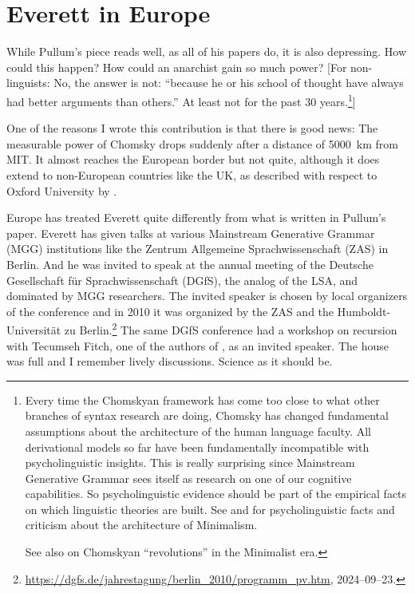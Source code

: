 \documentclass[output=paper,colorlinks,citecolor=brown]{langscibook}
\begin{document}
\section{Everett in Europe}

While Pullum's piece reads well, as all of his papers do, it is also depressing. How could this happen?
How could an anarchist gain so much power? [For non-linguists: No, the answer is not: ``because he or
his school of thought have always had better arguments than others.'' At least not for the past 30
years.\footnote{
Every time the Chomskyan framework has come too close to what other branches of syntax research are doing,
Chomsky has changed fundamental assumptions about the architecture of the human language faculty. All
derivational models so far have been fundamentally incompatible with psycholinguistic insights. This is really
surprising since Mainstream Generative Grammar sees itself as research on one of our cognitive capabilities. So
psycholinguistic evidence should be part of the empirical facts on which linguistic theories are
built. See \citet{Wasow2021a} and \citet{BM2021a} for psycholinguistic facts and criticism about the
architecture of Minimalism.

See also \citet{LLJ2000b,LLJ2000a,LLJ2001a} on Chomskyan ``revolutions'' in the Minimalist era.
}]

One of the reasons I wrote this contribution is that
there is good news: The measurable power of Chomsky drops suddenly after a distance of 5000~km from
MIT. It almost reaches the European border but not quite, although it does extend to non-European countries like
the UK, as described with respect to Oxford University by . 

Europe has treated Everett quite differently from what is written in Pullum's paper. Everett has given talks at
various Mainstream Generative Grammar (MGG) institutions like the Zentrum Allgemeine
Sprachwissenschaft (ZAS) in Berlin. And he was invited to
speak at the annual meeting of the Deutsche Gesellschaft für Sprachwissenschaft (DGfS), the analog of the
LSA, and dominated by MGG researchers. The invited speaker is chosen by local organizers of the
conference and in 2010 it was organized by the ZAS and the Humboldt-Universität zu Berlin.\footnote{
\url{https://dgfs.de/jahrestagung/berlin_2010/programm_pv.htm}, 2024--09--23.
}
The same DGfS conference had a workshop on recursion with Tecumseh Fitch, one of the authors of
\citet*{HCF2002a}, as an invited speaker. The house was full and I remember lively
discussions. Science as it should be.
\end{document}
